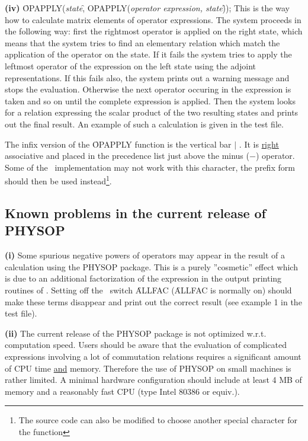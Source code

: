\textbf{(iv)} \f{OPAPPLY(}\textit{state}\f{, OPAPPLY(}\textit{operator expression,
state}\f{))}; This is the way how to calculate matrix elements of
operator
expressions. The system proceeds in the following way: first the
rightmost operator is applied on the right state, which means that the
system tries
to find an elementary relation which match the application of the
operator on the state. If it fails
the system tries to apply the leftmost operator of the expression on the
left state using the adjoint representations. If this fails also,
the system prints out a warning message and stops the evaluation.
Otherwise the next operator occuring in the expression is
taken and so on until the complete expression is applied.  Then the
system
looks for a relation expressing the scalar product of the two
resulting states and prints out the final result. An example of such
a calculation is given in the test file.

The infix version of the \f{OPAPPLY} function is the vertical bar $\mid$
. It is \underline{right} associative and placed in the precedence
list just above the minus ($-$) operator.
Some of the \REDUCE\ implementation may not work with this character,
the prefix form should then be used instead\footnote{The source code
can also be modified to choose another special character for the
function}.

\subsection{Known problems in the current release of PHYSOP}

\indent \textbf{(i)} Some spurious negative powers  of operators
may appear
in the result of a calculation using the PHYSOP package. This is a
purely ''cosmetic'' effect which is due to an additional
factorization of the expression in the output printing routines of
\REDUCE. Setting off the \REDUCE\ switch \f{ALLFAC}  (\f{ALLFAC} is normally
on)
should make these
terms disappear and print out the correct result (see example 1
in the test file).

\textbf{(ii)} The current release of the PHYSOP package is not optimized
w.r.t. computation speed. Users should be aware that the evaluation
of complicated expressions involving a lot of commutation relations
requires a significant amount of CPU time \underline{and} memory.
Therefore the use of PHYSOP on small machines is rather limited. A
minimal hardware configuration should include at least 4 MB of
memory and a reasonably fast CPU (type Intel 80386 or equiv.).

